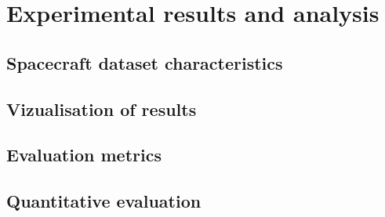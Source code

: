 
\chapter{Experimental results and analysis}\label{chapter:presentation_of_the_results}

\section{Spacecraft dataset characteristics}
\section{Vizualisation of results}
\section{Evaluation metrics}
\section{Quantitative evaluation}